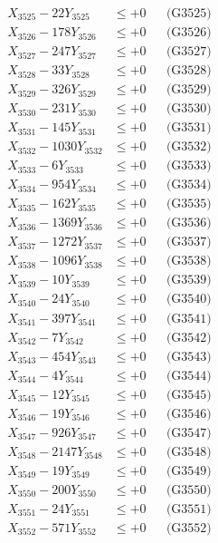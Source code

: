 \documentclass[a4paper,10pt]{article}
\begin{document}
{\begin{align}
X_{3525} - 22Y_{3525} &\leq +0 && \text{(G3525)} \\
X_{3526} - 178Y_{3526} &\leq +0 && \text{(G3526)} \\
X_{3527} - 247Y_{3527} &\leq +0 && \text{(G3527)} \\
X_{3528} - 33Y_{3528} &\leq +0 && \text{(G3528)} \\
X_{3529} - 326Y_{3529} &\leq +0 && \text{(G3529)} \\
X_{3530} - 231Y_{3530} &\leq +0 && \text{(G3530)} \\
\allowbreak
X_{3531} - 145Y_{3531} &\leq +0 && \text{(G3531)} \\
X_{3532} - 1030Y_{3532} &\leq +0 && \text{(G3532)} \\
X_{3533} - 6Y_{3533} &\leq +0 && \text{(G3533)} \\
X_{3534} - 954Y_{3534} &\leq +0 && \text{(G3534)} \\
X_{3535} - 162Y_{3535} &\leq +0 && \text{(G3535)} \\
X_{3536} - 1369Y_{3536} &\leq +0 && \text{(G3536)} \\
X_{3537} - 1272Y_{3537} &\leq +0 && \text{(G3537)} \\
X_{3538} - 1096Y_{3538} &\leq +0 && \text{(G3538)} \\
X_{3539} - 10Y_{3539} &\leq +0 && \text{(G3539)} \\
X_{3540} - 24Y_{3540} &\leq +0 && \text{(G3540)} \\
\allowbreak
X_{3541} - 397Y_{3541} &\leq +0 && \text{(G3541)} \\
X_{3542} - 7Y_{3542} &\leq +0 && \text{(G3542)} \\
X_{3543} - 454Y_{3543} &\leq +0 && \text{(G3543)} \\
X_{3544} - 4Y_{3544} &\leq +0 && \text{(G3544)} \\
X_{3545} - 12Y_{3545} &\leq +0 && \text{(G3545)} \\
X_{3546} - 19Y_{3546} &\leq +0 && \text{(G3546)} \\
X_{3547} - 926Y_{3547} &\leq +0 && \text{(G3547)} \\
X_{3548} - 2147Y_{3548} &\leq +0 && \text{(G3548)} \\
X_{3549} - 19Y_{3549} &\leq +0 && \text{(G3549)} \\
X_{3550} - 200Y_{3550} &\leq +0 && \text{(G3550)} \\
\allowbreak
X_{3551} - 24Y_{3551} &\leq +0 && \text{(G3551)} \\
X_{3552} - 571Y_{3552} &\leq +0 && \text{(G3552)} \\

\end{align}}
\end{document}

